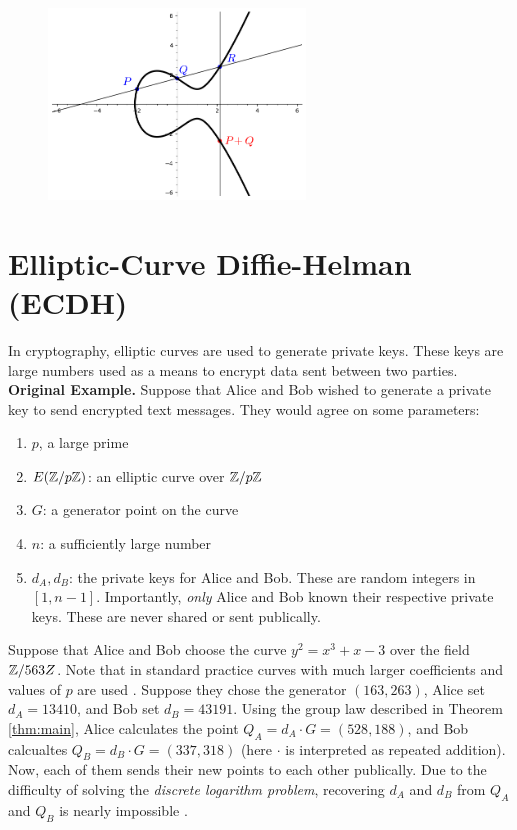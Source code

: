 \documentclass[]{../../math_paper}
\begin{document}
\begin{figure}[H]
    \centering
    \captionsetup{justification=centering}
    \includegraphics[height = 2in]{media/curve_4.png}
    \label{fig:curve4}
\end{figure}

\section{Elliptic-Curve Diffie-Helman (ECDH)} \label{sec:applications}
In cryptography, elliptic curves are used to generate private keys. These keys are large numbers used as a means to encrypt data sent between two parties.
\\

\noindent\textbf{Original Example.} Suppose that Alice and Bob wished to generate a private key to send encrypted text messages. They would agree on some parameters:
\begin{enumerate}
    \item $p$, a large prime
    \item $E(\mathbb{Z}/p\mathbb{Z})$: an elliptic curve over $\mathbb{Z}/p\mathbb{Z}$
    \item $G$: a generator point on the curve
    \item $n$: a sufficiently large number
    \item $d_A, d_B$: the private keys for Alice and Bob. These are random integers in $[1, n - 1]$. Importantly, \emph{only} Alice and Bob known their respective private keys. These are never shared or sent publically.
\end{enumerate}

Suppose that Alice and Bob choose the curve $y^2 = x^3 + x - 3$ over the field $\mathbb{Z}/563Z$. Note that in standard practice curves with much larger coefficients and values of $p$ are used \cite{stein2008elementary}. Suppose they chose the generator $(163, 263)$, Alice set $d_A = 13410$, and Bob set $d_B = 43191$. Using the group law described in Theorem \ref{thm:main}, Alice calculates the point $Q_A = d_A \cdot G = (528, 188)$, and Bob calcualtes $Q_B = d_B \cdot G = (337, 318)$ (here $\cdot$ is interpreted as repeated addition). Now, each of them sends their new points to each other publically. Due to the difficulty of solving the \emph{discrete logarithm problem}, recovering $d_A$ and $d_B$ from $Q_A$ and $Q_B$ is nearly impossible \cite{miller1986use}.
\end{document}
